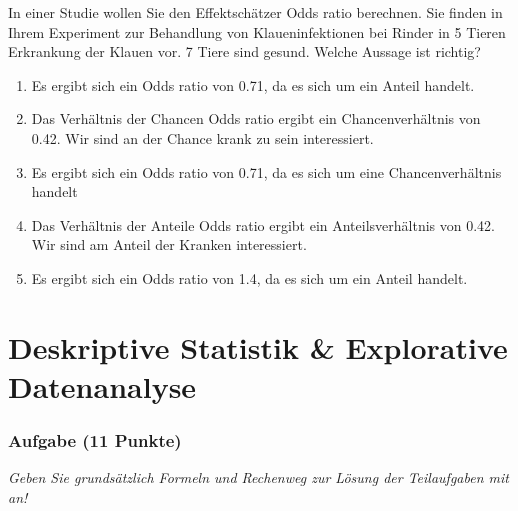 \documentclass[a4paper, 9pt]{scrartcl}\usepackage[]{graphicx}\usepackage[]{xcolor}
\begin{document}
In einer Studie wollen Sie den Effektschätzer Odds ratio berechnen. Sie finden in Ihrem Experiment zur Behandlung von Klaueninfektionen bei Rinder in 5 Tieren Erkrankung der Klauen vor. 7 Tiere sind gesund. Welche Aussage ist richtig?



\begin{enumerate}
\item [\textbf{A} \msquare] Es ergibt sich ein Odds ratio von 0.71, da es sich um ein Anteil handelt.
\item [\textbf{B} \msquare] Das Verhältnis der Chancen Odds ratio ergibt ein Chancenverhältnis von 0.42. Wir sind an der Chance krank zu sein interessiert.
\item [\textbf{C} \msquare] Es ergibt sich ein Odds ratio von 0.71, da es sich um eine Chancenverhältnis handelt
  
\item [\textbf{D} \msquare] Das Verhältnis der Anteile Odds ratio ergibt ein Anteilsverhältnis von 0.42. Wir sind am Anteil der Kranken interessiert.
\item [\textbf{E} \msquare] Es ergibt sich ein Odds ratio von 1.4, da es sich um ein Anteil handelt.
\end{enumerate}
    
\clearpage
\part{Deskriptive Statistik \& Explorative Datenanalyse}

\section{Aufgabe \hfill (11 Punkte)}

\textit{Geben Sie grundsätzlich Formeln und Rechenweg zur Lösung der Teilaufgaben mit an!} \\[1Ex]
 
\end{document}
